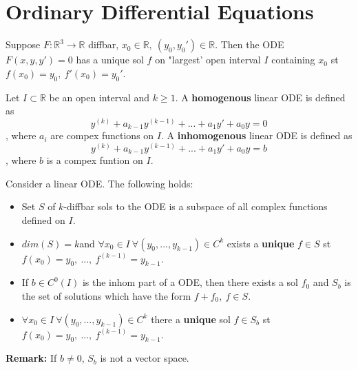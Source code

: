 \chapter{Ordinary Differential Equations}

\begin{theorem}
	Suppose $F: \mathbb{R}^3 \rightarrow \mathbb{R}$ diffbar, $x_0 \in \mathbb{R}, \  (y_0,y_0') \in \mathbb{R}$.
	Then the ODE $F(x,y,y') = 0$ has a unique sol $f$ on "largest' open interval $I$ containing $x_0$ st $f(x_0)= y_0, \ f'(x_0)=y_0'$.
\end{theorem}

\begin{definition}
	Let $I \subset \mathbb{R}$ be an open interval and $k \geq 1$. 
	A \textbf{homogenous} linear ODE is defined as
	$$ y^{(k)} + a_{k-1}y^{(k-1)} + ... + a_1y' + a_0y = 0 $$
	, where $a_i$ are compex functions on $I$.
	A \textbf{inhomogenous} linear ODE is defined as
	$$ y^{(k)} + a_{k-1}y^{(k-1)} + ... + a_1y' + a_0y = b$$
	, where $b$ is a compex funtion on $I$.
\end{definition}

\begin{theorem}
	Consider a linear ODE. The following holds:
	\begin{itemize}
		\item Set $S$ of $k$-diffbar sols to the ODE is a subspace of all complex functions defined on $I$.
		\item $dim(S)=k$and $\forall x_0 \in I \ \forall (y_0,...,y_{k-1}) \in C^k$ exists a \textbf{unique} $f\in S$ st $f(x_0) = y_0, \ ..., \ f^{(k-1)} = y_{k-1}$.
		\item If $b \in C^0(I)$ is the inhom part of a ODE, then there exists a sol $f_0$ and $S_b$ is the set of solutions which have the form $f + f_0, \ f \in S$.
		\item $\forall x_0 \in I \ \forall (y_0,...,y_{k-1}) \in C^k$ there a \textbf{unique} sol $f \in S_b$ st $f(x_0) = y_0, \ ..., \ f^{(k-1)} = y_{k-1}$.
	\end{itemize}
	\textbf{Remark:} If $b \neq 0$, $S_b$ is not a vector space. 
\end{theorem}

